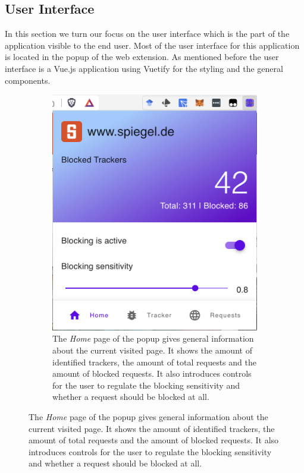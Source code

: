 \subsection{User Interface}
\label{sec:ui}
In this section we turn our focus on the user interface which is the part of the application visible to the end user. Most of the user 
interface for this application is located in the popup of the web extension. As mentioned before the user interface is a Vue.js application
using Vuetify for the styling and the general components.


\begin{figure}[ht!]  
  \centering
  \begin{subfigure}[b]{.30\textwidth}
      \centering
      \includegraphics[width=\linewidth ]{images/Home.png}
      \caption{The \emph{Home} page of the popup gives general information about the current visited page. It shows the amount
      of identified trackers, the amount of total requests and the amount of blocked requests. It also introduces controls
    for the user to regulate the blocking sensitivity and whether a request should be blocked at all.}
      \label{fig:Home}
  \end{subfigure}

\end{figure}

